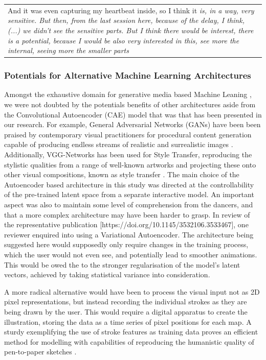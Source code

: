 \begin{center}
\begin{tabular}{ p{13cm}}
And it was even capturing my heartbeat inside, so I think it \textit{is, in a way, very sensitive. But then, from the last session here, because of the delay, I think, (...) we didn't see the sensitive parts. But I think there would be interest, there is a potential, because I would be also very interested in this, see more the internal, seeing more the smaller parts}
\end{tabular}
\end{center}

\subsubsection{Potentials for Alternative Machine Learning Architectures}

Amongst the exhaustive domain for generative media based Machine Leaning \cite{hertzmann_aesthetics_2019}, we were not doubted by the potentials benefits of other architectures aside from the Convolutional Autoencoder (CAE) model that was that has been presented in our research. For example, General Adversarial Networks (GANs) have been been praised by contemporary visual practitioners for procedural content generation capable of producing endless streams of realistic and surrealistic images \cite{karras_style-based_2019,Elgammal2017CANCA}. Additionally, VGG-Networks has been used for Style Transfer, reproducing the stylistic qualities from a range of well-known artworks and projecting these onto other visual compositions, known as style transfer \cite{gatys_neural_2015}. The main choice of the Autoencoder based architecture in this study was directed at the controllability of the pre-trained latent space from a separate interactive model. An important aspect was also to maintain some level of comprehension from the dancers, and that a more complex architecture may have been harder to grasp.
In review of the representative publication [https://doi.org/10.1145/3532106.3533467], one reviewer enquired into using a Variational Autoencoder. The architecture being suggested here would supposedly only require changes in the training process, which the user would not even see, and potentially lead to smoother animations. This would be owed the to the stronger regularisation of the model's latent vectors, achieved by taking statistical variance into consideration.

A more radical alternative would have been to process the visual input not as 2D pixel representations, but instead recording the individual strokes as they are being drawn by the user. This would require a digital apparatus to create the illustration, storing the data as a time series of pixel positions for each map. A sturdy exemplifying the use of stroke features as training data proves an efficient method for modelling with capabilities of reproducing the humanistic quality of pen-to-paper sketches \cite{ha_neural_2017}.

